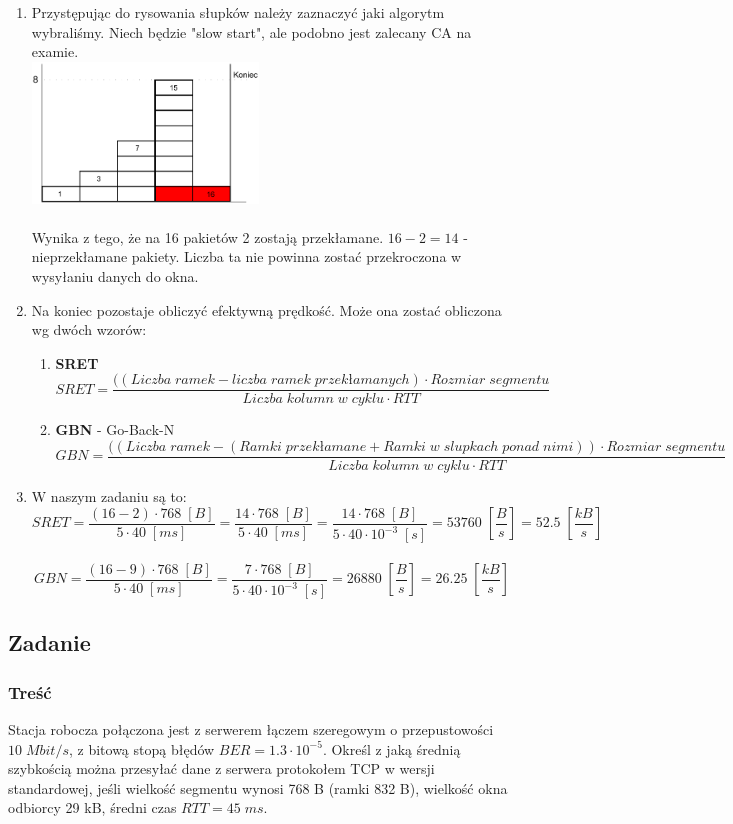 \begin{enumerate}
				\item Przystępując do rysowania słupków należy zaznaczyć jaki algorytm wybraliśmy. Niech będzie "slow start", ale podobno jest zalecany CA na examie.\\
				\includegraphics[width=6.0cm]{./images/zadanie07.pdf}\\\\
				Wynika z tego, że na 16 pakietów 2 zostają przekłamane. $ 16 - 2 = 14 $ - nieprzekłamane pakiety. Liczba ta nie powinna zostać przekroczona w wysyłaniu danych do okna.
				\item Na koniec pozostaje obliczyć efektywną prędkość. Może ona zostać obliczona wg dwóch wzorów:
				\begin{enumerate}
					\item \textbf{SRET}
					$$ SRET=\frac{((Liczba\;ramek - liczba\;ramek\;przekłamanych)\cdot Rozmiar\;segmentu}{Liczba\;kolumn\;w\;cyklu\cdot RTT} $$
					\item \textbf{GBN} - Go-Back-N
					$$ GBN=\frac{((Liczba\;ramek - (Ramki\;przekłamane + Ramki\;w\;slupkach\;ponad\;nimi))\cdot Rozmiar\;segmentu}{Liczba\;kolumn\;w\;cyklu\cdot RTT} $$
				\end{enumerate}
				\item W naszym zadaniu są to:
				$$ SRET=\frac{(16-2)\cdot 768\;[B]}{5\cdot 40\;[ms]}=\frac{14\cdot 768\;[B]}{5\cdot 40\;[ms]}=\frac{14\cdot 768\;[B]}{5\cdot 40\cdot 10^{-3}\;[s]}=53760\;[\frac{B}{s}]=52.5\; [\frac{kB}{s}]$$\\
				$$ GBN=\frac{(16-9)\cdot 768\;[B]}{5\cdot 40\;[ms]}=\frac{7\cdot 768\;[B]}{5\cdot 40\cdot 10^{-3}\;[s]}=26880\;[\frac{B}{s}]=26.25\;[\frac{kB}{s}] $$
			\end{enumerate}

	\subsection{Zadanie}
		\subsubsection{Treść}
			Stacja robocza połączona jest z serwerem łączem szeregowym o przepustowości $ 10\;Mbit/s $, z bitową stopą błędów $ BER=1.3\cdot 10^{-5} $. Określ z jaką średnią szybkością można przesyłać dane z serwera protokołem TCP w wersji standardowej, jeśli wielkość segmentu wynosi 768 B (ramki 832 B), wielkość okna odbiorcy 29 kB, średni czas $ RTT=45\;ms $.
